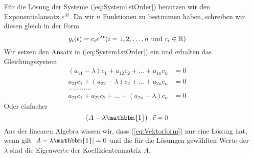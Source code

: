 Für die Lösung der Systeme (\ref{eq:System1stOrder}) benutzen wir den
Exponentialansatz $e^{\lambda t}$. Da wir $n$ Funktionen zu bestimmen haben,
schreiben wir diesen gleich in der Form
\begin{equation}
  y_i(t)=c_ie^{\lambda t}\hfill (i=1,2,\dots,n\mbox{ und }c_i\in\mathbb{R})
  \label{eq:SystemAnsatz}
\end{equation}
Wir setzen den Ansatz in (\ref{eq:System1stOrder}) ein und erhalten das
Gleichungssystem
\begin{align}
    (a_{11}-\lambda)c_1+a_{12}c_2+\dots+a_{1n}c_n&=0\nonumber\\
    a_{21}c_1+(a_{22}-\lambda)c_2+\dots+a_{2n}c_n&=0\nonumber\\
    \dots\dots\dots\dots\nonumber\\
    a_{21}c_1+a_{22}c_2+\dots+(a_{2n}-\lambda)c_n&=0
  \label{eq:System4cs}
\end{align}
Oder einfacher
\begin{equation}
  (A-\lambda\mathbbm{1})\cdot\vec{c}=0
  \label{eq:Vektorform}
\end{equation}
Aus der linearen Algebra wissen wir, dass (\ref{eq:Vektorform}) nur eine
Lösung hat, wenn gilt $|A-\lambda\mathbbm{1}|=0$ und die für die Lösungen
gewählten Werte der $\lambda$ sind die Eigenwerte der Koeffizientenmatrix $A$.

